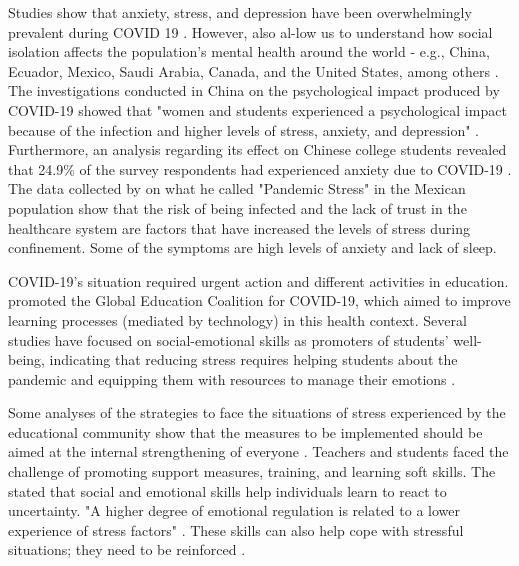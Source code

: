 \documentclass[english]{textolivre}
\begin{document}
Studies show that anxiety, stress, and depression have been overwhelmingly prevalent during COVID 19 \cite{shah_prevalence_2021,kar_stress_2021}. However, also al-low us to understand how social isolation affects the population's mental health around the world - e.g., China, Ecuador, Mexico, Saudi Arabia, Canada, and the United States, among others \cite{barraza_macias_estres_2020,wang_immediate_2020,joseph_immediate_2021,mautong_assessment_2021,turna_anxiety_2021}. The investigations conducted in China on the psychological impact produced by COVID-19 showed that "women and students experienced a psychological impact because of the infection and higher levels of stress, anxiety, and depression" \cite[p.~23]{wang_immediate_2020}. Furthermore, an analysis regarding its effect on Chinese college students revealed that 24.9\% of the survey respondents had experienced anxiety due to COVID-19 \cite{cao_psychological_2020}. The data collected by \textcite[p.~17]{barraza_macias_estres_2020} on what he called "Pandemic Stress" %
in the Mexican population show that the risk of being infected and the lack of trust in the healthcare system are factors that have increased the levels of stress during confinement. Some of the symptoms are high levels of anxiety and lack of sleep.

COVID-19's situation required urgent action and different activities in education. \textcite{unesco_covid-19_2020} promoted the Global Education Coalition for COVID-19, which aimed to improve learning processes (mediated by technology) in this health context. Several studies have focused on social-emotional skills as promoters of students' well-being, indicating that reducing stress requires helping students about the pandemic and equipping them with resources to manage their emotions \cite{salmelaaro_adolescents_2021}.

Some analyses of the strategies to face the situations of stress experienced by the educational community show that the measures to be implemented should be aimed at the internal strengthening of everyone \cite{valero_cedeno_afrontamiento_2020}. Teachers and students faced the challenge of promoting support measures, training, and learning soft skills. The \textcite{european_commission_recomendacion_2018} stated that social and emotional skills help individuals learn to react to uncertainty. "A higher degree of emotional regulation is related to a lower experience of stress factors" \cite[p.~12]{cuevas_lopez_emotional_2021}. These skills can also help cope with stressful situations; they need to be reinforced \cite{marrero_sanchez_habilidades_2018}.
\end{document}
